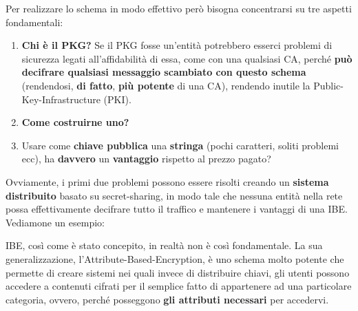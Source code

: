 Per realizzare lo schema in modo effettivo però bisogna concentrarsi su tre aspetti fondamentali:
\begin{enumerate}
    \item \textbf{Chi è il PKG?} Se il PKG fosse un'entità potrebbero esserci problemi di sicurezza legati all'affidabilità di essa, come con una qualsiasi CA, perché \textbf{può decifrare qualsiasi messaggio scambiato con questo schema} (rendendosi, \textbf{di fatto}, \textbf{più potente} di una CA), rendendo inutile la Public-Key-Infrastructure (PKI).
    \item \textbf{Come costruirne uno?} 
    \item Usare come \textbf{chiave pubblica} una \textbf{stringa} (pochi caratteri, soliti problemi ecc), ha \textbf{davvero} un \textbf{vantaggio} rispetto al prezzo pagato?
\end{enumerate}
Ovviamente, i primi due problemi possono essere risolti creando un \textbf{sistema distribuito} basato su secret-sharing, in modo tale che nessuna entità nella rete possa effettivamente decifrare tutto il traffico e mantenere i vantaggi di una IBE. Vediamone un esempio:


\begin{remark}
IBE, così come è stato concepito, in realtà non è così fondamentale. La sua generalizzazione, l'Attribute-Based-Encryption, è uno schema molto potente che permette di creare sistemi nei quali invece di distribuire chiavi, gli utenti possono accedere a contenuti cifrati per il semplice fatto di appartenere ad una particolare categoria, ovvero, perché posseggono \textbf{gli attributi necessari} per accedervi.
\end{remark}
